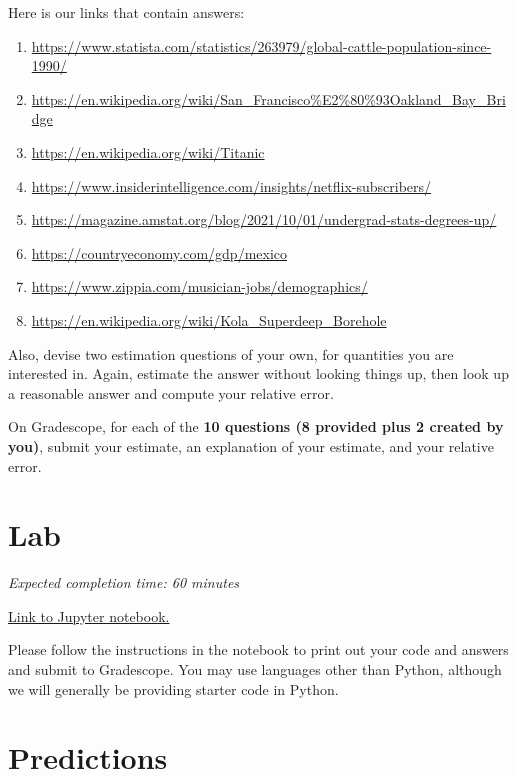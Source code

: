\documentclass[11pt]{article}
\begin{document}
Here is our links that contain answers:
\begin{enumerate}
\item \url{https://www.statista.com/statistics/263979/global-cattle-population-since-1990/}
\item \url{https://en.wikipedia.org/wiki/San_Francisco%E2%80%93Oakland_Bay_Bridge}
\item \url{https://en.wikipedia.org/wiki/Titanic}
\item \url{https://www.insiderintelligence.com/insights/netflix-subscribers/}
\item \url{https://magazine.amstat.org/blog/2021/10/01/undergrad-stats-degrees-up/}
\item \url{https://countryeconomy.com/gdp/mexico}
\item \url{https://www.zippia.com/musician-jobs/demographics/}
\item \url{https://en.wikipedia.org/wiki/Kola_Superdeep_Borehole}
\end{enumerate}

Also, devise two estimation questions of your own, for quantities you are interested in. Again, estimate the answer without looking things up, then look up a reasonable answer and compute your relative error.

On Gradescope, for each of the \textbf{10 questions (8 provided plus 2 created by you)}, submit your estimate, an explanation of your estimate, and your relative error.

\section*{Lab}

\emph{Expected completion time: 60 minutes}

\href{https://datahub.berkeley.edu/hub/user-redirect/git-pull?repo=https%3A%2F%2Fgithub.com%2Fjs-d%2Fstat-157-260-website&urlpath=tree%2Fstat-157-260-website%2Fhw%2Fhw2%2Fhw2_lab.ipynb&branch=main}{Link to Jupyter notebook.} 

Please follow the instructions in the notebook to print out your code and answers and submit to Gradescope. You may use languages other than Python, although we will generally be providing starter code in Python.



\section*{Predictions}
\end{document}
